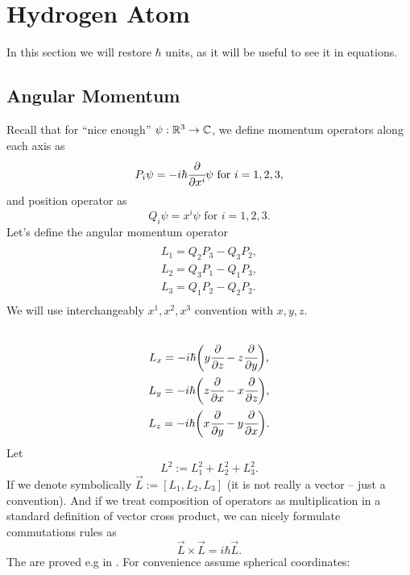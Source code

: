 \documentclass[main.tex]{subfiles}
\begin{document}
\section{Hydrogen Atom}
In this section we will restore $\hbar$ units, as it will be useful to see it in equations.
\subsection{Angular Momentum}
Recall that for ``nice enough'' $\psi:\mathbb{R}^3\to\mathbb{C}$, we define momentum operators along each axis as
\begin{equation}
P_i \psi = -i\hbar \cfrac{\partial}{\partial x^i}\psi \text{ for } i=1,2,3,
\end{equation}
and position operator as
\begin{equation}
Q_i\psi = x^i\psi \text{ for } i=1,2,3.
\end{equation}
Let's define the angular momentum operator
\begin{multline}\\
L_1 = Q_2P_3 - Q_3P_2, \\
L_2 = Q_3P_1 - Q_1P_3, \\
L_3 = Q_1P_2 - Q_2P_2. \\
\end{multline}
We will use interchangeably $x^1, x^2, x^3$ convention with $x,y,z$.
\begin{multline}
\\
L_x = -i\hbar\bigg( y\cfrac{\partial}{\partial z} - z\cfrac{\partial}{\partial y}\bigg),\\
L_y = -i\hbar\bigg( z\cfrac{\partial}{\partial x} - x\cfrac{\partial}{\partial z}\bigg),\\
L_z = -i\hbar\bigg( x\cfrac{\partial}{\partial y} - y\cfrac{\partial}{\partial x}\bigg).\\
\end{multline}
Let 
\begin{equation}
L^2 := L_1^2 + L_2^2 + L_3^2.
\end{equation}
If we denote symbolically $\vec{L} := [L_1, L_2, L_3]$ (it is not really a vector -- just a convention). And if we treat composition of operators as multiplication in a standard definition of vector cross product, we can nicely formulate commutations rules as
\begin{equation}
\vec{L}\times \vec{L} = i\hbar \vec{L}.
\end{equation}
The are proved e.g in \cite[see][4.8 Angular-Momentum Operators]{walter-greiner2001}.
For convenience assume spherical coordinates:
\end{document}

